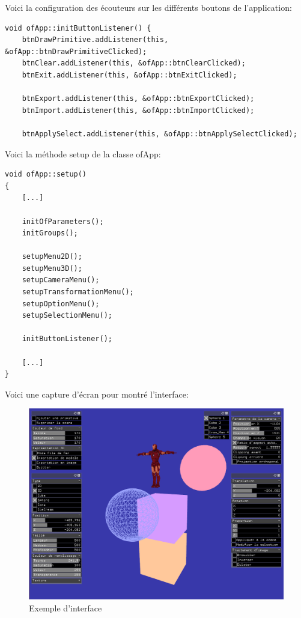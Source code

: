 Voici la configuration des écouteurs sur les différents boutons de l'application:
\begin{lstlisting}
void ofApp::initButtonListener() {
	btnDrawPrimitive.addListener(this, &ofApp::btnDrawPrimitiveClicked);
	btnClear.addListener(this, &ofApp::btnClearClicked);
	btnExit.addListener(this, &ofApp::btnExitClicked);
	
	btnExport.addListener(this, &ofApp::btnExportClicked);
	btnImport.addListener(this, &ofApp::btnImportClicked);
	
	btnApplySelect.addListener(this, &ofApp::btnApplySelectClicked);

\end{lstlisting}

Voici la méthode setup de la classe ofApp:
\begin{lstlisting}
void ofApp::setup()
{
	[...]
	
	initOfParameters();
	initGroups();
	
	setupMenu2D();
	setupMenu3D();
	setupCameraMenu();
	setupTransformationMenu();
	setupOptionMenu();
	setupSelectionMenu();
	
	initButtonListener();
	
	[...]
}
\end{lstlisting}

Voici une capture d'écran pour montré l'interface:
\begin{figure}[h]
	\centering
	\includegraphics[width=15cm]{fig/InterfaceComplet.png}
	\caption{Exemple d'interface}
	\label{fig:interface}
\end{figure}

\pagebreak
